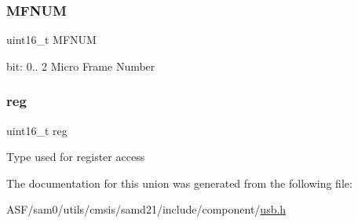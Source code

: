 \subsubsection{\texorpdfstring{MFNUM}{MFNUM}}
{\footnotesize\ttfamily uint16\+\_\+t M\+F\+N\+UM}

bit\+: 0.. 2 Micro Frame Number \mbox{\label{union_u_s_b___d_e_v_i_c_e___f_n_u_m___type_a11760f5020019f4aa8cb02e694f7cc44}} 
\subsubsection{\texorpdfstring{reg}{reg}}
{\footnotesize\ttfamily uint16\+\_\+t reg}

Type used for register access 

The documentation for this union was generated from the following file\+:\begin{DoxyCompactItemize}
\item 
A\+S\+F/sam0/utils/cmsis/samd21/include/component/\mbox{\hyperlink{component_2usb_8h}{usb.\+h}}\end{DoxyCompactItemize}
